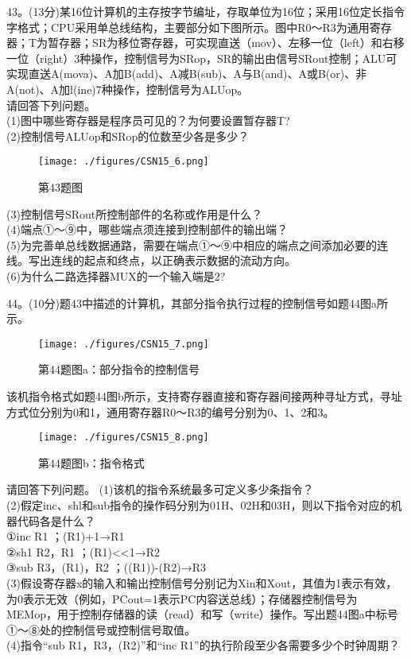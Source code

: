 43。(13分)某16位计算机的主存按字节编址，存取单位为16位；采用16位定长指令字格式；CPU采用单总线结构，主要部分如下图所示。图中R0～R3为通用寄存器；T为暂存器；SR为移位寄存器，可实现直送（mov）、左移一位（left）和右移一位（right）3种操作，控制信号为SRop，SR的输出由信号SRout控制；ALU可实现直送A(mova)、A加B(add)、A减B(sub)、A与B(and)、A或B(or)、非A(not)、A加l(ine)7种操作，控制信号为ALUop。 \\
请回答下列问题。 \\
(1)图中哪些寄存器是程序员可见的？为何要设置暂存器T? \\
(2)控制信号ALUop和SRop的位数至少各是多少？
\begin{figure}[ht]
\centering
\texttt{[image: ./figures/CSN15\_6.png]}
\caption{第43题图} \label{CSN15_fig6}
\end{figure}
(3)控制信号SRout所控制部件的名称或作用是什么？ \\
(4)端点①～⑨中，哪些端点须连接到控制部件的输出端？ \\
(5)为完善单总线数据通路，需要在端点①～⑨中相应的端点之间添加必要的连线。写出连线的起点和终点，以正确表示数据的流动方向。 \\
(6)为什么二路选择器MUX的一个输入端是2?

44。(10分)题43中描述的计算机，其部分指令执行过程的控制信号如题44图a所示。
\begin{figure}[ht]
\centering
\texttt{[image: ./figures/CSN15\_7.png]}
\caption{第44题图a：部分指令的控制信号} \label{CSN15_fig7}
\end{figure}
该机指令格式如题44图b所示，支持寄存器直接和寄存器间接两种寻址方式，寻址方式位分别为0和1，通用寄存器R0～R3的编号分别为0、1、2和3。
\begin{figure}[ht]
\centering
\texttt{[image: ./figures/CSN15\_8.png]}
\caption{第44题图b：指令格式} \label{CSN15_fig8}
\end{figure}
请回答下列问题。
(1)该机的指令系统最多可定义多少条指令？ \\
(2)假定inc、shl和sub指令的操作码分别为01H、02H和03H，则以下指令对应的机器代码各是什么？ \\
①inc R1 ；(R1)+1→R1 \\
②sh1 R2，R1 ；(R1)<<1→R2 \\
③sub R3，(R1)，R2 ；((R1))-(R2)→R3 \\
(3)假设寄存器x的输入和输出控制信号分别记为Xin和Xout，其值为1表示有效，为0表示无效（例如，PCout=1表示PC内容送总线）；存储器控制信号为MEMop，用于控制存储器的读（read）和写（write）操作。写出题44图a中标号①～⑧处的控制信号或控制信号取值。 \\
(4)指令“sub R1，R3，(R2)”和“inc R1”的执行阶段至少各需要多少个时钟周期？

